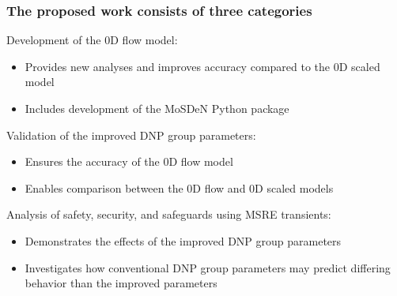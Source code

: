 \begin{frame}
  \frametitle{The proposed work consists of three categories}
    \begin{block}{Development of the 0D flow model:}
        \begin{itemize}
	    \item Provides new analyses and improves accuracy compared to the 0D scaled model
            \item Includes development of the \gls{MoSDeN} Python package
        \end{itemize}
    \end{block}
    \pause
    \begin{block}{Validation of the improved \gls{DNP} group parameters:}
        \begin{itemize}
            \item Ensures the accuracy of the 0D flow model
            \item Enables comparison between the 0D flow and 0D scaled models
        \end{itemize}
    \end{block}
    \pause
    \begin{block}{Analysis of safety, security, and safeguards using \gls{MSRE} transients:}
        \begin{itemize}
            \item Demonstrates the effects of the improved \gls{DNP} group parameters
            \item Investigates how conventional \gls{DNP} group parameters may predict differing behavior than the improved parameters
        \end{itemize}
    \end{block}
\end{frame}
